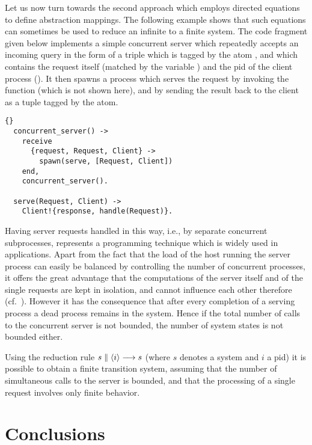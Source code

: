 \documentclass{entcs}
\begin{document}
\bigskip
Let us now turn towards the second approach which employs directed equations
to define abstraction mappings. The following example shows that such
equations can sometimes be used to reduce an infinite to a finite system. The
code fragment given below implements a simple concurrent server which repeatedly
accepts an incoming query in the form of a triple which is tagged by the
atom , and which contains the request itself (matched by
the variable ) and the pid of the client process
(). It then spawns a process which serves the request by invoking
the  function (which is not shown here), and by sending the
result back to the client as a tuple tagged by the  atom.

\medskip
\begin{lstlisting}[gobble=2]{}
  concurrent_server() ->
    receive
      {request, Request, Client} ->
        spawn(serve, [Request, Client])
    end,
    concurrent_server(). 

  serve(Request, Client) -> 
    Client!{response, handle(Request)}.
\end{lstlisting} 

Having server requests handled in this way, i.e., by separate concurrent
subprocesses, represents a programming technique which is widely used in
\Erlang applications. Apart from the fact that the load of the host
running the server process can easily be balanced by controlling the number of
concurrent processes, it offers the great advantage that the computations of
the server itself and of the single requests are kept in isolation, and cannot
influence each other therefore (cf.\ \cite[Chapter~8]{AVWW96}). However it has
the consequence that after every completion of a serving process a dead process
remains in the system. Hence if the total number of calls to the concurrent
server is not bounded, the number of system states is not bounded either.

Using the reduction
rule $s \parallel \langle i\rangle \stackrel{}{\longrightarrow} s$ (where $s$ denotes a system and
$i$ a pid) it is possible to obtain a finite transition system, assuming that
the number of simultaneous calls to the server is bounded, and that the
processing of a single request involves only finite behavior.



\section{Conclusions}
\label{SctConcl}
\end{document}
